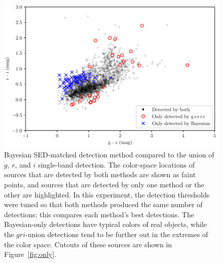 \documentclass[11pt,letterpaper,linenumbers]{aastex63}
\newcommand{\figref}[1]{\mbox{Figure~\ref{#1}}}
\begin{document}
\begin{figure}
  \begin{center}
    \includegraphics[height=0.4\textwidth]{bayes-vs-gri}
    \caption{Bayesian SED-matched detection method compared to the
      union of $g$, $r$, and $i$ single-band detection.  The
      color-space locations of sources that are detected by both
      methods are shown as faint points, and sources that are detected
      by only one method or the other are highlighted.  In this
      experiment, the detection thresholds were tuned so that both
      methods produced the same number of detections; this compares
      each method's best detections.  The Bayesian-only detections
      have typical colors of real objects, while the $gri$-union
      detections tend to be further out in the extremes of the color space.
      Cutouts of these sources
      are shown in \figref{fig:only}.
      \label{fig:bayes-vs-gri}}
  \end{center}
\end{figure}
\end{document}
